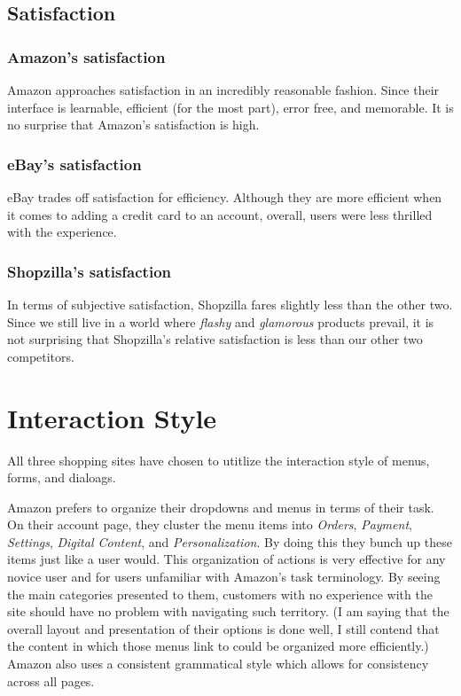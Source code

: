 \documentclass[11pt, oneside]{article}
\begin{document}
	\subsection{Satisfaction}

		\subsubsection{Amazon's satisfaction}
		Amazon approaches satisfaction in an incredibly reasonable fashion. Since their interface is learnable, efficient (for the most part), error free, and memorable. It is no surprise that Amazon's satisfaction is high.

		\subsubsection{eBay's satisfaction}
		eBay trades off satisfaction for efficiency. Although they are more efficient when it comes to adding a credit card to an account, overall, users were less thrilled with the experience.

		\subsubsection{Shopzilla's satisfaction}
		In terms of subjective satisfaction, Shopzilla fares slightly less than the other two. Since we still live in a world where \textit{flashy} and \textit{glamorous} products prevail, it is not surprising that Shopzilla's relative satisfaction is less than our other two competitors.


\section{Interaction Style}

	All three shopping sites have chosen to utitlize the interaction style of menus, forms, and dialoags.

	Amazon prefers to organize their dropdowns and menus in terms of their task. On their account page, they cluster the menu items into \textit{Orders}, \textit{Payment}, \textit{Settings}, \textit{Digital Content}, and \textit{Personalization}. By doing this they bunch up these items just like a user would. This organization of actions is very effective for any novice user and for users unfamiliar with Amazon's task terminology. By seeing the main categories presented to them, customers with no experience with the site should have no problem with navigating such territory. (I am saying that the overall layout and presentation of their options is done well, I still contend that the content in which those menus link to could be organized more efficiently.) Amazon also uses a consistent grammatical style which allows for consistency across all pages.
\end{document}
